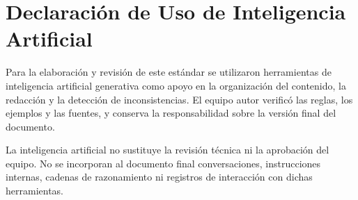 \section{Declaración de Uso de Inteligencia Artificial}

Para la elaboración y revisión de este estándar se utilizaron herramientas de inteligencia artificial generativa como apoyo en la organización del contenido, la redacción y la detección de inconsistencias. El equipo autor verificó las reglas, los ejemplos y las fuentes, y conserva la responsabilidad sobre la versión final del documento.

La inteligencia artificial no sustituye la revisión técnica ni la aprobación del equipo. No se incorporan al documento final conversaciones, instrucciones internas, cadenas de razonamiento ni registros de interacción con dichas herramientas.
